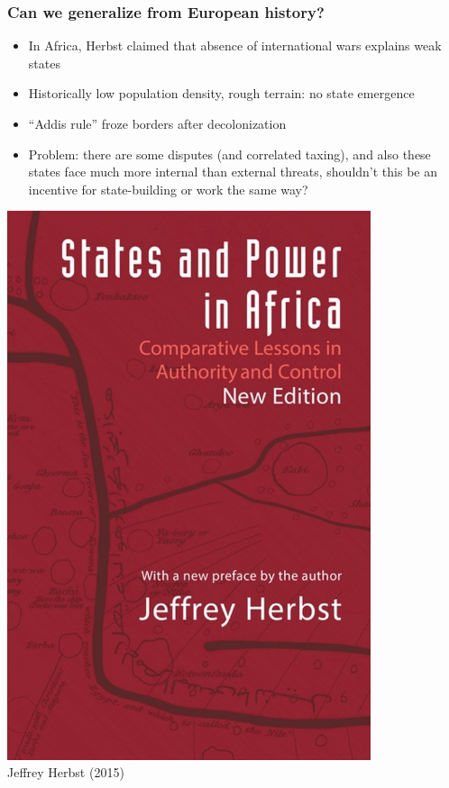\documentclass[utf8, xcolor=dvipsnames, handout]{beamer}
\begin{document}
\begin{frame}
\frametitle{Can we generalize from European history?}
\centering

\begin{minipage}{0.6\textwidth}\centering
  \begin{itemize}
    \item In Africa, Herbst claimed that absence of international wars explains weak states
    \item Historically low population density, rough terrain: no state emergence
    \item ``Addis rule'' froze borders after decolonization
    \item Problem: there are some disputes (and correlated taxing), and also these states face much more internal than external threats, shouldn't this be an incentive for state-building or work the same way?
  \end{itemize}
\end{minipage}\hfill
\begin{minipage}{0.4\textwidth}\centering
  \includegraphics[width = 0.8\textwidth]{img/herbst}\\
  {\small Jeffrey Herbst (2015)}
\end{minipage}

\end{frame}
\end{document}
